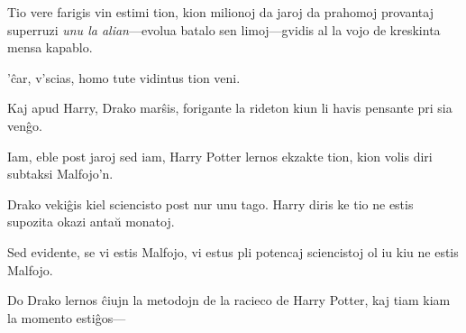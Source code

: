Tio vere farigis vin estimi tion, kion milionoj da jaroj da prahomoj
provantaj superruzi \emph{unu la alian}—evolua batalo sen limoj—gvidis
al la vojo de kreskinta mensa kapablo.

'ĉar, v'scias, homo tute vidintus tion veni.

\later

Kaj apud Harry, Drako marŝis, forigante la rideton kiun li havis pensante pri sia venĝo.

Iam, eble post jaroj sed iam, Harry Potter lernos ekzakte tion, kion volis diri subtaksi Malfojo'n.

Drako vekiĝis kiel sciencisto post nur unu tago. Harry diris ke tio ne
estis supozita okazi antaŭ monatoj.

Sed evidente, se vi estis Malfojo, vi estus pli potencaj sciencistoj
ol iu kiu ne estis Malfojo.

Do Drako lernos ĉiujn la metodojn de la racieco de Harry Potter, kaj
tiam kiam la momento estiĝos—

